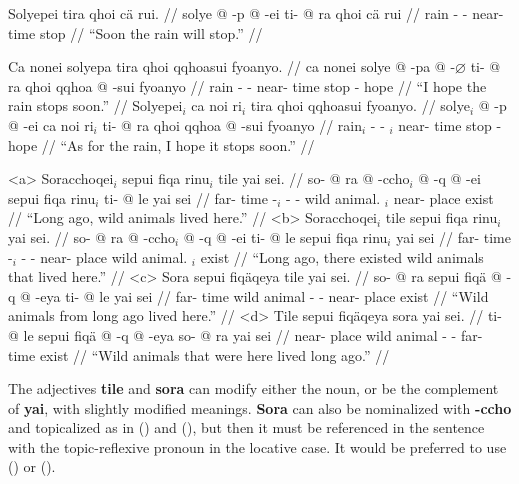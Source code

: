 \documentclass{article}
\begin{document}
\ex[lingstyle=QuCheanya] \begingl
\glpreamble Solyepei tira qhoi c\"a rui. //
\gla solye @ -p @ -ei ti- @ ra qhoi c\"a rui //
\glb rain - - near- time stop   //
\glft ``Soon the rain will stop.'' //
\endgl \xe

\pex[lingstyle=QuCheanya] 
\a \begingl
\glpreamble Ca nonei solyepa tira qhoi qqhoasui fyoanyo. //
\gla ca nonei solye @ -pa @ -$\varnothing$ ti- @ ra qhoi qqhoa @ -sui fyoanyo //
\glb {}  rain - - near- time stop  - hope //
\glft ``I hope the rain stops soon.'' //
\endgl
\a \begingl
\glpreamble Solyepei$_i$ ca noi ri$_i$ tira qhoi qqhoasui fyoanyo. //
\gla solye$_i$ @ -p @ -ei ca noi ri$_i$ ti- @ ra qhoi qqhoa @ -sui fyoanyo //
\glb rain$_i$ - -   $_i$ near- time stop  - hope //
\glft ``As for the rain, I hope it stops soon.'' //
\endgl \xe

\pex[lingstyle=QuCheanya,tag=animals] 
\a<a> \begingl
\glpreamble Soracchoqei$_i$ sepui fiqa rinu$_i$ tile yai sei. //
\gla so- @ ra @ -ccho$_i$ @ -q @ -ei sepui fiqa rinu$_i$ ti- @ le yai sei //
\glb far- time -$_i$ - - wild animal. $_i$ near- place exist  //
\glft ``Long ago, wild animals lived here.'' //
\endgl 
\a<b> \begingl
\glpreamble Soracchoqei$_i$ tile sepui fiqa rinu$_i$ yai sei. //
\gla so- @ ra @ -ccho$_i$ @ -q @ -ei ti- @ le sepui fiqa rinu$_i$ yai sei //
\glb far- time -$_i$ - - near- place wild animal. $_i$ exist  //
\glft ``Long ago, there existed wild animals that lived here.'' //
\endgl
\a<c> \begingl
\glpreamble Sora sepui fiq\"aqeya tile yai sei. //
\gla so- @ ra sepui fiq\"a @ -q @ -eya ti- @ le yai sei //
\glb far- time wild animal - - near- place exist  //
\glft ``Wild animals from long ago lived here.'' //
\endgl
\a<d> \begingl
\glpreamble Tile sepui fiq\"aqeya sora yai sei. //
\gla ti- @ le sepui fiq\"a @ -q @ -eya so- @ ra yai sei //
\glb near- place wild animal - - far- time exist  //
\glft ``Wild animals that were here lived long ago.'' //
\endgl
\xe

The adjectives \textbf{tile} and \textbf{sora} can modify either the noun, or be the complement of \textbf{yai}, with slightly modified meanings.  \textbf{Sora} can also be nominalized with \textbf{-ccho} and topicalized as in () and (), but then it must be referenced in the sentence with the topic-reflexive pronoun in the locative case. It would be preferred to use () or ().
\end{document}
